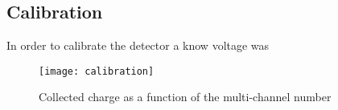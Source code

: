 \subsection{Calibration}
In order to calibrate the detector a know voltage was
\label{sec:calibration}
\begin{figure}[!h]
  \centering
  \texttt{[image: calibration]}
  \caption{Collected charge as a function of the multi-channel number}
  \label{fig:calibration}
\end{figure}
